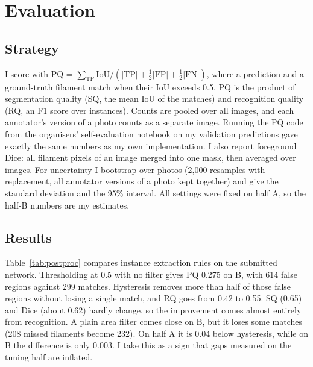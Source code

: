 \documentclass[sigconf]{acmart}
\begin{document}
\section{Evaluation}\label{sec:evaluation}

\subsection{Strategy}
I score with PQ = $\sum_{\mathrm{TP}}\mathrm{IoU} / (|\mathrm{TP}| + \frac12|\mathrm{FP}| + \frac12|\mathrm{FN}|)$, where a prediction and a ground-truth filament match when their IoU exceeds 0.5. PQ is the product of segmentation quality (SQ, the mean IoU of the matches) and recognition quality (RQ, an F1 score over instances). Counts are pooled over all images, and each annotator's version of a photo counts as a separate image. Running the PQ code from the organisers' self-evaluation notebook on my validation predictions gave exactly the same numbers as my own implementation. I also report foreground Dice: all filament pixels of an image merged into one mask, then averaged over images. For uncertainty I bootstrap over photos (2{,}000 resamples with replacement, all annotator versions of a photo kept together) and give the standard deviation and the 95\% interval. All settings were fixed on half A, so the half-B numbers are my estimates.

\subsection{Results}
Table~\ref{tab:postproc} compares instance extraction rules on the submitted network. Thresholding at 0.5 with no filter gives PQ 0.275 on B, with 614 false regions against 299 matches. Hysteresis removes more than half of those false regions without losing a single match, and RQ goes from 0.42 to 0.55. SQ (0.65) and Dice (about 0.62) hardly change, so the improvement comes almost entirely from recognition. A plain area filter comes close on B, but it loses some matches (208 missed filaments become 232). On half A it is 0.04 below hysteresis, while on B the difference is only 0.003. I take this as a sign that gaps measured on the tuning half are inflated.
\end{document}
